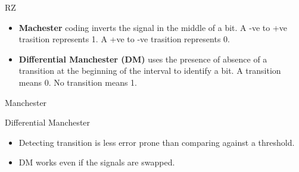 \begin{cf}{
	RZ
	\vspace{1cm}

}
\end{cf}

\begin{cf}{\small
	\begin{itemize}
	\item \textbf{Machester} coding inverts the signal in the middle of a bit.  A -ve to +ve trasition represents 1.  A +ve to -ve trasition represents 0.
	\item \textbf{Differential Manchester (DM)} uses the presence of absence of a transition at the beginning of the interval to identify a bit.  A transition means 0.  No transition means 1.
	\end{itemize}
}
\end{cf}

\begin{cf}{
	Manchester
	\vspace{1cm}

}
\end{cf}

\begin{cf}{
	Differential Manchester
	\vspace{1cm}

}
\end{cf}

\begin{cf}{\small
	\begin{itemize}
	\item Detecting transition is less error prone than comparing against a threshold.
	\item DM works even if the signals are swapped.
	\end{itemize}
}
\end{cf}

